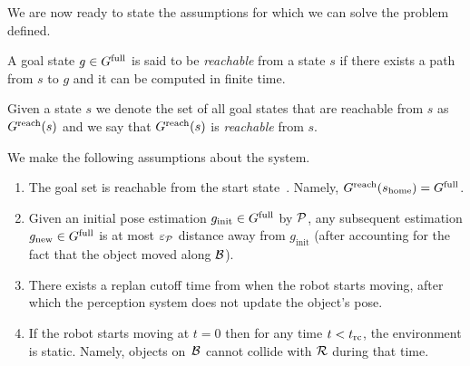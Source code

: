 \documentclass[conference]{IEEEtran}
\begin{document}
We are now ready to state the assumptions for which we can solve the problem defined.

\begin{definition}
    A goal state $g \in G^{\textrm{full}}$ is said to be \emph{reachable} from a state $s$ if there exists a path from $s$ to $g$ and it can be computed in finite time.
\end{definition}

Given a state $s$ we denote the set of all goal states that are reachable from $s$ as $G^{\rm reach}(s)$ and we say that $G^{\rm reach}(s)$ is \emph{reachable} from $s$.



We make the following assumptions about the system.
\begin{enumerate}[label={\textbf{A\arabic*}},leftmargin=0.75cm]
    \item \label{assum:1} The goal set \Gfull is reachable from the start state~\Shome. Namely,  $G^{\rm reach}(s_{\textrm{home}}) = G^{\textrm{full}}$.
    

 
    \item \label{assum:3} Given an initial pose estimation $g_{\textrm{init}} \in G^{\textrm{full}}$ by $\mathcal{P}$, any subsequent estimation $g_{\textrm{new}} \in G^{\textrm{full}}$ is at most $\varepsilon_\mathcal{P}$ distance away from $g_{\textrm{init}}$ (after accounting for the fact that the object moved along $\mathcal{B}$).

    \item \label{assum:4} There exists a replan cutoff time \Trc from when the robot starts moving, after which the perception system does not update the object's pose.
    
    \item \label{assum:5} If the robot starts moving at $t = 0$ then for any time $t < t_{\textrm{rc}}$, the environment is static. Namely, objects on~$\mathcal{B}$ cannot collide with $\mathcal{R}$ during that time.
\end{enumerate}
\end{document}
